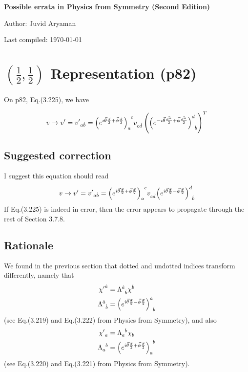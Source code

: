 \documentclass[11pt]{article}
\numberwithin{equation}{section}
\newcommand{\tn}[2]{\tensor{#1}{#2}}
\begin{document}
\begin{flushleft}
\textbf{\Large Possible errata in Physics from Symmetry (Second Edition)}
\end{flushleft}

\begin{flushleft}
Author: Juvid Aryaman

Last compiled: \today
\end{flushleft}


\section{$(\frac{1}{2}, \frac{1}{2})$ Representation (p82)}

On p82, Eq.(3.225), we have

\begin{equation}
v \rightarrow v' = \tn{{v'}}{_a_{\dot{b}}} = \tn{{\left(e^{i \vec{\theta} \frac{\vec{\sigma}}{2} + \vec{\phi} \frac{\vec{\sigma}}{2}} \right)}}{_a^c} \tn{v}{_c_{\dot{d}}} \left(\tn{{\left(e^{-i \vec{\theta} \frac{\vec{\sigma^*}}{2} + \vec{\phi} \frac{\vec{\sigma^*}}{2}} \right)}}{^{\dot{d}}_{\dot{b}}}\right)^T  \nonumber
\end{equation}

\subsection{Suggested correction}

I suggest this equation should read
\begin{equation}
v \rightarrow v' = \tn{{v'}}{_a_{\dot{b}}} = \tn{{\left(e^{i \vec{\theta} \frac{\vec{\sigma}}{2} + \vec{\phi} \frac{\vec{\sigma}}{2}} \right)}}{_a^c} \tn{v}{_c_{\dot{d}}} \tn{{\left(e^{i \vec{\theta} \frac{\vec{\sigma}}{2} - \vec{\phi} \frac{\vec{\sigma}}{2}} \right)}}{^{\dot{d}}_{\dot{b}}}  \label{eq:my-fix}
\end{equation}
If Eq.(3.225) is indeed in error, then the error appears to propagate through the rest of Section 3.7.8.

\subsection{Rationale}
We found in the previous section that dotted and undotted indices transform differently, namely that
\begin{align}
\tn{{\chi'}}{^{\dot{a}}} &= \tn{\Lambda}{^{\dot{a}}_{\dot{b}}} \tn{\chi}{^{\dot{b}}} \\
\tn{\Lambda}{^{\dot{a}}_{\dot{b}}} &= \tn{{\left(e^{i \vec{\theta} \frac{\vec{\sigma}}{2} - \vec{\phi}\frac{\vec{\sigma}}{2}} \right)}}{^{\dot{a}}_{\dot{b}}} \label{eq:right-chiral}
\end{align}
(see Eq.(3.219) and Eq.(3.222) from Physics from Symmetry), and also
\begin{align}
\tn{{\chi'}}{_a} &= \tn{\Lambda}{_a^b} \tn{\chi}{_b} \\
\tn{\Lambda}{_a^b} &= \tn{{\left(e^{i \vec{\theta} \frac{\vec{\sigma}}{2} + \vec{\phi}\frac{\vec{\sigma}}{2}} \right)}}{_a^b} \label{eq:left-chiral}
\end{align}
(see Eq.(3.220) and Eq.(3.221) from Physics from Symmetry).
\end{document}

